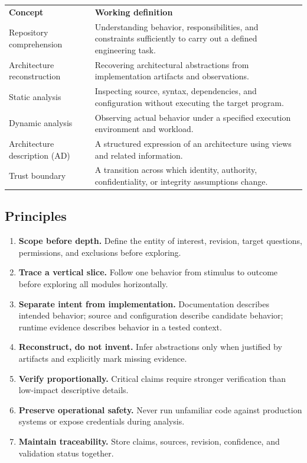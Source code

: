 \documentclass[11pt,letterpaper]{article}
\newcommand{\tablehead}[2]{\rowcolor{navy}\color{white}\textbf{#1}&\color{white}\textbf{#2}\\}
\begin{document}
\noindent\begin{tabularx}{\linewidth}{@{}P{1.7in}Y@{}}
\tablehead{Concept}{Working definition}
Repository comprehension & Understanding behavior, responsibilities, and constraints sufficiently to carry out a defined engineering task.\\
Architecture reconstruction & Recovering architectural abstractions from implementation artifacts and observations.\\
Static analysis & Inspecting source, syntax, dependencies, and configuration without executing the target program.\\
Dynamic analysis & Observing actual behavior under a specified execution environment and workload.\\
Architecture description (AD) & A structured expression of an architecture using views and related information.\\
Trust boundary & A transition across which identity, authority, confidentiality, or integrity assumptions change.\\
\bottomrule
\end{tabularx}
\subsection{Principles}
\begin{enumerate}
\item \textbf{Scope before depth.} Define the entity of interest, revision, target questions, permissions, and exclusions before exploring.
\item \textbf{Trace a vertical slice.} Follow one behavior from stimulus to outcome before exploring all modules horizontally.
\item \textbf{Separate intent from implementation.} Documentation describes intended behavior; source and configuration describe candidate behavior; runtime evidence describes behavior in a tested context.
\item \textbf{Reconstruct, do not invent.} Infer abstractions only when justified by artifacts and explicitly mark missing evidence.
\item \textbf{Verify proportionally.} Critical claims require stronger verification than low-impact descriptive details.
\item \textbf{Preserve operational safety.} Never run unfamiliar code against production systems or expose credentials during analysis.
\item \textbf{Maintain traceability.} Store claims, sources, revision, confidence, and validation status together.
\end{enumerate}
\end{document}
